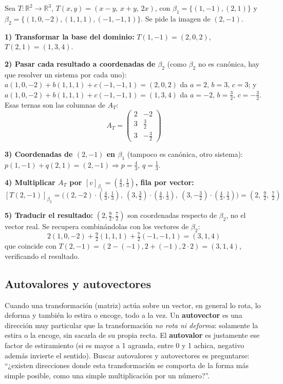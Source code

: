 \documentclass[11pt,a4paper]{article}
\begin{document}
\begin{ejemplo}
Sea $T:\mathbb{R}^2\to\mathbb{R}^3$, $T(x,y)=(x-y,\,x+y,\,2x)$, con
$\beta_1=\{(1,-1),(2,1)\}$ y $\beta_2=\{(1,0,-2),(1,1,1),(-1,-1,1)\}$. Se pide la imagen de
$(2,-1)$.

\textbf{1) Transformar la base del dominio:} $T(1,-1)=(2,0,2)$, $T(2,1)=(1,3,4)$.

\textbf{2) Pasar cada resultado a coordenadas de $\beta_2$} (como $\beta_2$ no es canónica,
hay que resolver un sistema por cada uno): $a(1,0,-2)+b(1,1,1)+c(-1,-1,1)=(2,0,2)$ da
$a=2,\,b=3,\,c=3$; y $a(1,0,-2)+b(1,1,1)+c(-1,-1,1)=(1,3,4)$ da $a=-2,\,b=\tfrac32,\,c=-\tfrac32$.
Esas ternas son las columnas de $A_T$:
\[
A_T=\begin{pmatrix}2&-2\\[2pt]3&\tfrac32\\[2pt]3&-\tfrac32\end{pmatrix}
\]

\textbf{3) Coordenadas de $(2,-1)$ en $\beta_1$} (tampoco es canónica, otro sistema):
$p(1,-1)+q(2,1)=(2,-1)\Rightarrow p=\tfrac43,\,q=\tfrac13$.

\textbf{4) Multiplicar $A_T$ por $[v]_{\beta_1}=(\tfrac43,\tfrac13)$, fila por vector:}
\[
[T(2,-1)]_{\beta_2}=\Big((2,-2)\cdot(\tfrac43,\tfrac13),\ (3,\tfrac32)\cdot(\tfrac43,\tfrac13),\
(3,-\tfrac32)\cdot(\tfrac43,\tfrac13)\Big)=\left(2,\ \tfrac92,\ \tfrac72\right)
\]

\textbf{5) Traducir el resultado:} $(2,\tfrac92,\tfrac72)$ son coordenadas respecto de
$\beta_2$, no el vector real. Se recupera combinándolas con los vectores de $\beta_2$:
\[
2(1,0,-2)+\tfrac92(1,1,1)+\tfrac72(-1,-1,1)=(3,1,4)
\]
que coincide con $T(2,-1)=(2-(-1),2+(-1),2\cdot2)=(3,1,4)$, verificando el resultado.
\end{ejemplo}

\subsection{Autovalores y autovectores}

\begin{intuicion}
Cuando una transformación (matriz) actúa sobre un vector, en general lo rota, lo deforma
y también lo estira o encoge, todo a la vez. Un \textbf{autovector} es una dirección muy
particular que la transformación \emph{no rota ni deforma}: solamente la estira o la
encoge, sin sacarla de su propia recta. El \textbf{autovalor} es justamente ese factor de
estiramiento (si es mayor a 1 agranda, entre 0 y 1 achica, negativo además invierte el
sentido). Buscar autovalores y autovectores es preguntarse: ``¿existen direcciones donde
esta transformación se comporta de la forma más simple posible, como una simple
multiplicación por un número?''.
\end{intuicion}
\end{document}
